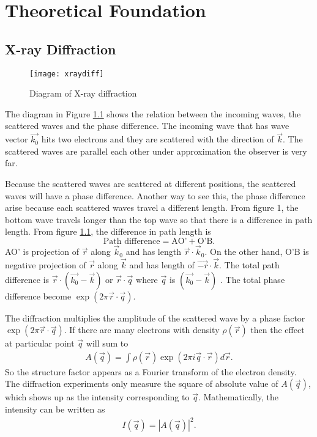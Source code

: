 \chapter{Theoretical Foundation}
\section{X-ray Diffraction}
\begin{figure}[ht]
  \centering
  \texttt{[image: xraydiff]}
\caption{Diagram of X-ray diffraction}
\label{fig:xraydiff}
\end{figure}
The diagram in Figure \ref{fig:xraydiff} shows the relation between the incoming waves, the scattered waves and the phase difference. The incoming wave that has wave vector $\vec{k_{0}}$ hits two electrons and they are scattered with the direction of $\vec{k}$. The scattered waves are parallel each other under approximation the observer is very far.

Because the scattered waves are scattered at different positions, the scattered waves will have a phase difference. Another way to see this, the phase difference arise because each scattered waves travel a different length. From figure 1, the bottom wave travels longer than the top wave so that there is a difference in path length.
From figure \ref{fig:xraydiff}, the difference in path length is
\begin{equation}
\mbox{Path difference}=\mbox{AO'}+\mbox{O'B}.
\end{equation}
AO' is projection of $\vec{r}$ along $\vec{k}_{0}$ and has length $\vec{r} \cdot \vec{k}_{0} $. On the other hand, O'B is negative projection of $\vec{r}$ along $\vec{k}$ and has length of $\vec{-r}\cdot \vec{k}$. The total path difference is $\vec{r} \cdot (\vec{k_{0}}-\vec{k})$ or $\vec{r} \cdot \vec{q}$ where $\vec{q}$ is $(\vec{k_{0}}-\vec{k})$ . The total phase difference become $\exp(2 \pi \vec{r} \cdot \vec{q})$.

The diffraction multiplies the amplitude of the scattered wave by a phase factor $\exp(2 \pi \vec{r} \cdot \vec{q})$. If there are many electrons with density $\rho(\vec{r})$ then the effect at particular point $\vec{q}$  will sum to
\begin{eqnarray}
A(\vec{q})=\int \rho(\vec{r}) \exp(2 \pi i \vec{q} \cdot \vec{r}) d \vec{r}.
\label{eq:ftransform}
\end{eqnarray}
So the structure factor appears as a Fourier transform of the electron density. The diffraction experiments only measure the square of absolute value of $A(\vec{q})$, which shows up as the intensity corresponding to $\vec{q}$. Mathematically, the intensity can be written as
\begin{eqnarray}
I(\vec{q})=|A(\vec{q})|^2. 
\label{intensquare}
\end{eqnarray}

